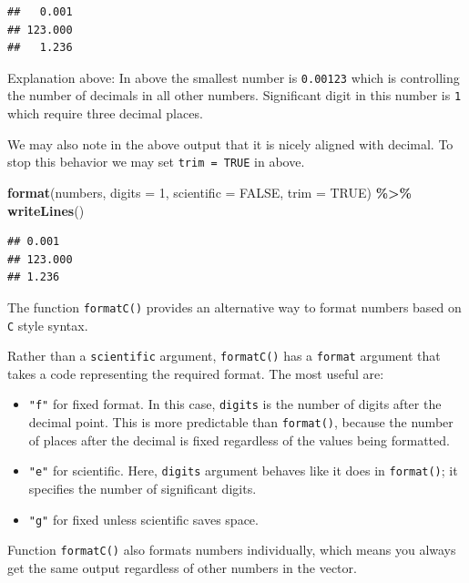 \documentclass[
]{book}
\newenvironment{Shaded}{\begin{snugshade}}{\end{snugshade}}
\newcommand{\AttributeTok}[1]{\textcolor[rgb]{0.13,0.29,0.53}{#1}}
\newcommand{\ConstantTok}[1]{\textcolor[rgb]{0.56,0.35,0.01}{#1}}
\newcommand{\DecValTok}[1]{\textcolor[rgb]{0.00,0.00,0.81}{#1}}
\newcommand{\FunctionTok}[1]{\textcolor[rgb]{0.13,0.29,0.53}{\textbf{#1}}}
\newcommand{\NormalTok}[1]{#1}
\newcommand{\SpecialCharTok}[1]{\textcolor[rgb]{0.81,0.36,0.00}{\textbf{#1}}}
\providecommand{\tightlist}{%
  \setlength{\itemsep}{0pt}\setlength{\parskip}{0pt}}
\begin{document}
\begin{verbatim}
##   0.001
## 123.000
##   1.236
\end{verbatim}

Explanation above: In above the smallest number is \texttt{0.00123} which is controlling the number of decimals in all other numbers. Significant digit in this number is \texttt{1} which require three decimal places.

We may also note in the above output that it is nicely aligned with decimal. To stop this behavior we may set \texttt{trim\ =\ TRUE} in above.

\begin{Shaded}
\begin{Highlighting}[]
\FunctionTok{format}\NormalTok{(numbers, }
       \AttributeTok{digits =} \DecValTok{1}\NormalTok{, }
       \AttributeTok{scientific =} \ConstantTok{FALSE}\NormalTok{,}
       \AttributeTok{trim =} \ConstantTok{TRUE}\NormalTok{) }\SpecialCharTok{\%\textgreater{}\%} 
  \FunctionTok{writeLines}\NormalTok{()}
\end{Highlighting}
\end{Shaded}

\begin{verbatim}
## 0.001
## 123.000
## 1.236
\end{verbatim}

The function \texttt{formatC()} provides an alternative way to format numbers based on \texttt{C} style syntax.

Rather than a \texttt{scientific} argument, \texttt{formatC()} has a \texttt{format} argument that takes a code representing the required format. The most useful are:

\begin{itemize}
\tightlist
\item
  \texttt{"f"} for fixed format. In this case, \texttt{digits} is the number of digits after the decimal point. This is more predictable than \texttt{format()}, because the number of places after the decimal is fixed regardless of the values being formatted.
\item
  \texttt{"e"} for scientific. Here, \texttt{digits} argument behaves like it does in \texttt{format()}; it specifies the number of significant digits.
\item
  \texttt{"g"} for fixed unless scientific saves space.
\end{itemize}

Function \texttt{formatC()} also formats numbers individually, which means you always get the same output regardless of other numbers in the vector.
\end{document}
